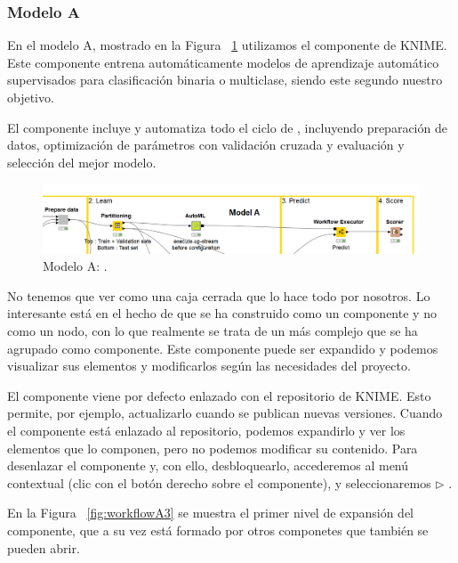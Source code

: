 \subsubsection{Modelo A}

En el modelo A, mostrado en la Figura ~\ref{fig:workflowA1} utilizamos el componente  de KNIME. Este componente entrena automáticamente modelos 
de aprendizaje automático supervisados para clasificación binaria o multiclase, siendo este segundo nuestro objetivo. 

El componente incluye y automatiza todo el ciclo de , incluyendo preparación de datos, optimización 
de parámetros con validación cruzada y evaluación y selección del mejor modelo. 

\begin{figure}[!htb]
	\centering
	\includegraphics[width=1\textwidth]{img/workflowA1.png}
	\caption{Modelo A: .}
	\label{fig:workflowA1}
\end{figure}
\FloatBarrier

No tenemos que ver  como una caja cerrada que lo hace todo por nosotros. Lo interesante está en el hecho de que 
 se ha construido como un componente y no como un nodo, con lo que realmente se trata de un  más complejo 
que se ha agrupado como componente. Este componente puede ser expandido y podemos visualizar sus elementos y modificarlos 
según las necesidades del proyecto. 

El componente viene por defecto enlazado con el repositorio de KNIME. Esto permite, por ejemplo, actualizarlo cuando se publican nuevas versiones. 
Cuando el componente está enlazado al repositorio, podemos expandirlo y ver los elementos que lo componen, pero no podemos 
modificar su contenido. Para desenlazar el componente y, con ello, desbloquearlo, accederemos al menú contextual (clic con el botón derecho sobre el componente), y 
seleccionaremos \textbf{ $\triangleright$ }. 

En la Figura ~\ref{fig:workflowA3} se muestra el primer nivel de expansión del componente,
que a su vez está formado por otros componetes que también se pueden abrir. 

